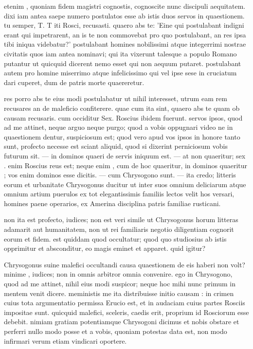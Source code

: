  etenim , quoniam fidem magistri cognostis, cognoscite nunc discipuli aequitatem. dixi iam antea saepe numero postulatos esse ab istis duos servos in quaestionem. tu semper, T. T iti Rosci, recusasti. quaero abs te: 'Eine qui postulabant indigni erant qui impetrarent, an is te non commovebat pro quo postulabant, an res ipsa tibi iniqua videbatur?' postulabant homines nobilissimi atque integerrimi nostrae civitatis quos iam antea nominavi; qui ita vixerunt talesque a populo Romano putantur ut quicquid dicerent nemo esset qui non aequum putaret. postulabant autem pro homine miserrimo atque infelicissimo qui vel ipse sese in cruciatum dari cuperet, dum de patris morte quaereretur.

 res porro abs te eius modi postulabatur ut nihil interesset, utrum eam rem recusares an de maleficio confiterere. quae cum ita sint, quaero abs te quam ob causam recusaris. cum occiditur Sex. Roscius ibidem fuerunt. servos ipsos, quod ad me attinet, neque arguo neque purgo; quod a vobis oppugnari video ne in quaestionem dentur, suspiciosum est; quod vero apud vos ipsos in honore tanto sunt, profecto necesse est sciant aliquid, quod si dixerint perniciosum vobis futurum sit. — in dominos quaeri de servis iniquum est. — at non quaeritur; sex . enim Roscius reus est; neque enim , cum de hoc quaeritur, in dominos quaeritur ; vos enim dominos esse dicitis. — cum Chrysogono sunt. — ita credo; litteris eorum et urbanitate Chrysogonus ducitur ut inter suos omnium deliciarum atque omnium artium puerulos ex tot elegantissimis familiis lectos velit hos versari, homines paene operarios, ex Amerina disciplina patris familiae rusticani.

 non ita est profecto, iudices; non est veri simile ut Chrysogonus horum litteras adamarit aut humanitatem, non ut rei familiaris negotio diligentiam cognorit eorum et fidem. est quiddam quod occultatur; quod quo studiosius ab istis opprimitur et absconditur, eo magis eminet et apparet. quid igitur?

 Chrysogonus suine malefici occultandi causa quaestionem de eis haberi non volt? minime , iudices; non in omnis arbitror omnia convenire. ego in Chrysogono, quod ad me attinet, nihil eius modi suspicor; neque hoc mihi nunc primum in mentem venit dicere. meministis me ita distribuisse initio causam : in crimen cuius tota argumentatio permissa Erucio est, et in audaciam cuius partes Rosciis impositae sunt. quicquid malefici, sceleris, caedis erit, proprium id Rosciorum esse debebit. nimiam gratiam potentiamque Chrysogoni dicimus et nobis obstare et perferri nullo modo posse et a vobis, quoniam potestas data est, non modo infirmari verum etiam vindicari oportere.

